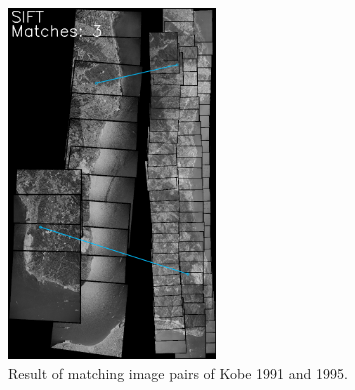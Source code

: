 \begin{figure}[htbp]
\begin{center}
{\begin{minipage}[t]{0.45\linewidth}
                \includegraphics[width=5.5cm]{images/Chapitre3/Pseudo-Homol-SIFT2Step_1991-1994-Rough-2DRANSAC-GlobalR3D-PileImg_Ortho-MEC-Malt_Tapas_1991_Ortho-MEC-Malt_Tapas_1994.png}
            \end{minipage}%
        }
        \caption{Result of matching image pairs of Kobe 1991 and 1995.}
        \label{Match result}
    \end{center}
\end{figure} 


